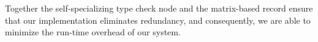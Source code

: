 Together the self-specializing type check node and the matrix-based record
ensure that our implementation eliminates redundancy, and
consequently, we are able to minimize the run-time overhead of our system. 

